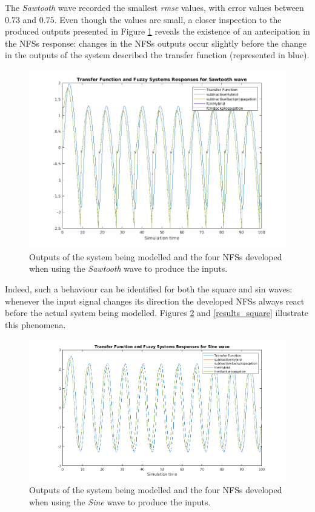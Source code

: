 \documentclass[11pt]{article}
\begin{document}
The \emph{Sawtooth} wave recorded the smallest \emph{rmse} values, with error values between $0.73$ and $0.75$. Even though the values are small, a closer inspection to the produced outputs presented in Figure \ref{results_sawtooth} reveals the existence of an antecipation in the NFSs response: changes in the NFSs outputs occur slightly before the change in the outputs of the system described the transfer function (represented in blue).

\begin{figure}[H]
	\centering
	\includegraphics[scale=0.5]{images/assessment_sawtooth.png}
	\caption{Outputs of the system being modelled and the four NFSs developed when using the \emph{Sawtooth} wave to produce the inputs.}
	\label{results_sawtooth}
\end{figure}

Indeed, such a behaviour can be identified for both the square and sin waves: whenever the input signal changes its direction the developed NFSs always react before the actual system being modelled. Figures \ref{results_sine} and \ref{results_square} illustrate this phenomena.


\begin{figure}[H]
	\centering
	\includegraphics[scale=0.5]{images/assessment_sine.png}
	\caption{Outputs of the system being modelled and the four NFSs developed when using the \emph{Sine} wave to produce the inputs.}
	\label{results_sine}
\end{figure}
\end{document}
